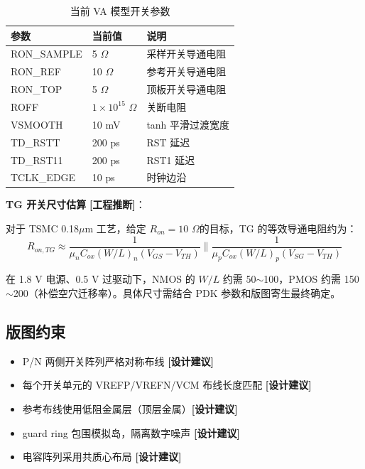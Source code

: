 \documentclass[UTF8,a4paper,11pt]{ctexart}
\newcommand{\inferred}{\textcolor{inferorange}{\textbf{[工程推断]}}}
\newcommand{\suggested}{\textcolor{suggestblue}{\textbf{[设计建议]}}}
\providecommand{\textOmega}{\ensuremath{\Omega}}
\providecommand{\textmu}{\ensuremath{\mu}}
\begin{document}
\begin{table}[H]
\centering
\caption{当前 VA 模型开关参数}
\label{tab:va-switch-params}
\begin{tabular}{lll}
\toprule
参数 & 当前值 & 说明 \\
\midrule
RON\_SAMPLE & 5 \textOmega         & 采样开关导通电阻 \\
RON\_REF    & 10 \textOmega        & 参考开关导通电阻 \\
RON\_TOP    & 5 \textOmega         & 顶板开关导通电阻 \\
ROFF        & $1\times10^{15}$ \textOmega & 关断电阻 \\
VSMOOTH     & 10 mV                & tanh 平滑过渡宽度 \\
TD\_RSTT    & 200 ps               & RST 延迟 \\
TD\_RST11   & 200 ps               & RST1 延迟 \\
TCLK\_EDGE  & 10 ps                & 时钟边沿 \\
\bottomrule
\end{tabular}
\end{table}

\textbf{TG 开关尺寸估算} \inferred：

对于 TSMC 0.18\textmu m 工艺，给定 $R_{on} = 10$ \textOmega 的目标，TG 的等效导通电阻约为：
\begin{equation}
R_{on,TG} \approx \frac{1}{\mu_n C_{ox} (W/L)_n (V_{GS} - V_{TH})} \parallel \frac{1}{\mu_p C_{ox} (W/L)_p (V_{SG} - V_{TH})}
\label{eq:ron-tg}
\end{equation}

在 1.8 V 电源、0.5 V 过驱动下，NMOS 的 $W/L$ 约需 50$\sim$100，PMOS 约需 150$\sim$200（补偿空穴迁移率）。具体尺寸需结合 PDK 参数和版图寄生最终确定。

\subsection{版图约束}

\begin{itemize}[leftmargin=2em]
\item P/N 两侧开关阵列严格对称布线 \suggested
\item 每个开关单元的 VREFP/VREFN/VCM 布线长度匹配 \suggested
\item 参考布线使用低阻金属层（顶层金属）\suggested
\item guard ring 包围模拟岛，隔离数字噪声 \suggested
\item 电容阵列采用共质心布局 \suggested
\end{itemize}
\end{document}

